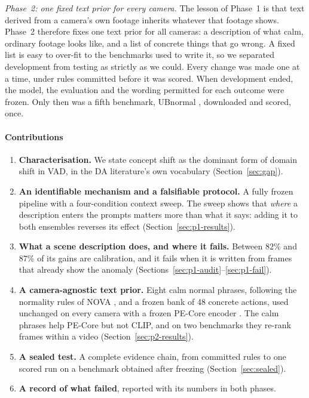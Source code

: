 \documentclass[conference,a4paper]{IEEEtran}
\begin{document}
\emph{Phase~2: one fixed text prior for every camera.} The lesson of Phase~1 is
that text derived from a camera's own footage inherits whatever that footage
shows. Phase~2 therefore fixes one text prior for all cameras: a description of
what calm, ordinary footage looks like, and a list of concrete things that go
wrong. A fixed list is easy to over-fit to the benchmarks used to write it, so we
separated development from testing as strictly as we could. Every change was made
one at a time, under rules committed before it was scored. When development
ended, the model, the evaluation and the wording permitted for each outcome were
frozen. Only then was a fifth benchmark, UBnormal \cite{acsintoae2022ubnormal},
downloaded and scored, once.

\paragraph*{Contributions}
\begin{enumerate}
  \item \textbf{Characterisation.} We state concept shift as the dominant form of
        domain shift in VAD, in the DA literature's own vocabulary
        (Section~\ref{sec:gap}).
  \item \textbf{An identifiable mechanism and a falsifiable protocol.} A fully
        frozen pipeline with a four-condition context sweep. The sweep shows
        that \emph{where} a description enters the prompts matters more than
        what it says: adding it to both ensembles reverses its effect
        (Section~\ref{sec:p1-results}).
  \item \textbf{What a scene description does, and where it fails.} Between
        $82\%$ and $87\%$ of its gains are calibration, and it fails when it is
        written from frames that already show the anomaly
        (Sections~\ref{sec:p1-audit}--\ref{sec:p1-fail}).
  \item \textbf{A camera-agnostic text prior.} Eight calm normal phrases,
        following the normality rules of NOVA \cite{yin2026nova}, and a frozen
        bank of 48 concrete actions, used unchanged on every camera with a frozen
        PE-Core encoder \cite{bolya2025pe}. The calm phrases help PE-Core but not
        CLIP, and on two benchmarks they re-rank frames within a video
        (Section~\ref{sec:p2-results}).
  \item \textbf{A sealed test.} A complete evidence chain, from committed rules
        to one scored run on a benchmark obtained after freezing
        (Section~\ref{sec:sealed}).
  \item \textbf{A record of what failed}, reported with its numbers in both
        phases.
\end{enumerate}
\end{document}
